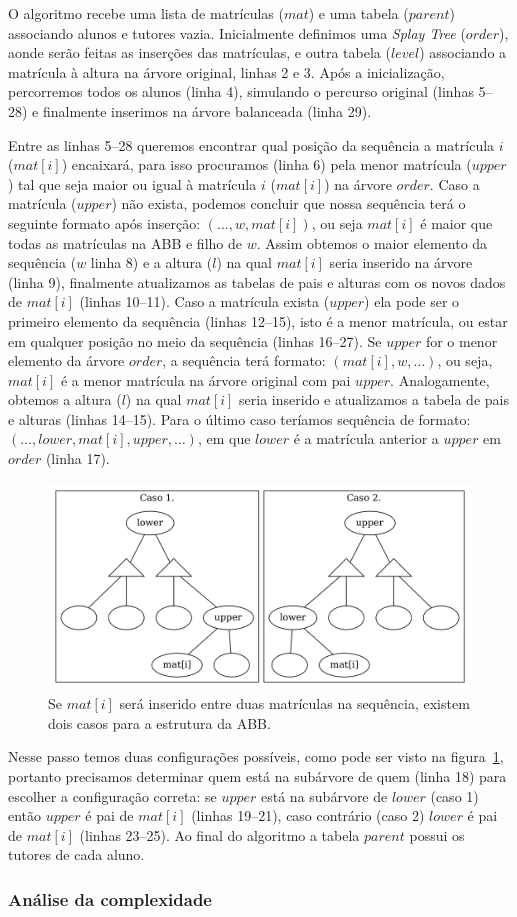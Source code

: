 O algoritmo recebe uma lista de matrículas ($mat$) e uma tabela ($parent$) associando alunos e
tutores vazia. Inicialmente definimos uma \textit{Splay Tree} ($order$), aonde
serão feitas as inserções das matrículas, e outra tabela ($level$) associando a matrícula à
altura na árvore original, linhas 2 e 3. Após a inicialização, percorremos todos
os alunos (linha 4), simulando o percurso original (linhas 5--28) e finalmente
inserimos na árvore balanceada (linha 29).

Entre as linhas 5--28 queremos
encontrar qual posição da sequência a matrícula $i$ ($mat[i]$) encaixará,
para isso procuramos (linha 6) pela menor matrícula ($upper$) tal que seja maior
ou igual à matrícula $i$ ($mat[i]$) na árvore $order$. Caso a matrícula ($upper$) não
exista, podemos concluir que nossa sequência terá o seguinte formato após inserção: $(\ldots,
w,mat[i])$, ou seja $mat[i]$ é maior que todas as matrículas na ABB e filho de $w$. Assim obtemos o maior elemento da sequência ($w$ linha
8) e a altura ($l$) na qual $mat[i]$ seria inserido na árvore (linha 9),
finalmente atualizamos as tabelas de pais e alturas com os novos dados de $mat[i]$
(linhas 10--11). Caso a matrícula exista ($upper$) ela pode ser o primeiro
elemento da sequência (linhas 12--15), isto é a menor matrícula, ou estar em qualquer posição no
meio da sequência (linhas 16--27). Se $upper$ for o menor elemento da árvore
$order$, a sequência terá formato: $(mat[i], w, \ldots)$, ou seja, $mat[i]$ é a
menor matrícula na árvore original com pai $upper$. Analogamente, obtemos a altura ($l$) na qual
$mat[i]$ seria inserido e atualizamos a tabela de pais e alturas (linhas 14--15).
Para o último caso teríamos sequência de formato: $(\ldots, lower, mat[i],
upper, \ldots)$, em que $lower$ é a matrícula anterior a $upper$ em $order$
(linha 17).
\begin{figure}[!htb]
  \centering
  \includegraphics[width=0.7\linewidth]{lxu.png}
  \caption{Se $mat[i]$ será inserido entre duas matrículas na sequência, existem dois casos para a estrutura da ABB.}
  \label{fig:lxu}
\end{figure}
Nesse passo temos duas configurações possíveis, como pode ser visto
na figura~\ref{fig:lxu}, portanto precisamos determinar quem está na subárvore
de quem (linha 18) para escolher a configuração correta: se $upper$ está na subárvore de $lower$ (caso 1) então $upper$ é pai de $mat[i]$ (linhas 19--21), caso contrário (caso 2) $lower$ é pai de $mat[i]$ (linhas 23--25). Ao final do algoritmo a
tabela $parent$ possui os tutores de cada aluno.

\subsubsection{Análise da complexidade}
